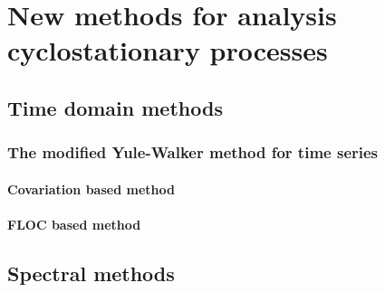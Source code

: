 \chapter{New methods for analysis cyclostationary \stab processes}\label{chap::new_methods}
\section{Time domain methods}
\subsection{The modified Yule-Walker method for \stab time series}
\subsubsection{Covariation based method}
\subsubsection{FLOC based method}
\section{Spectral methods}
